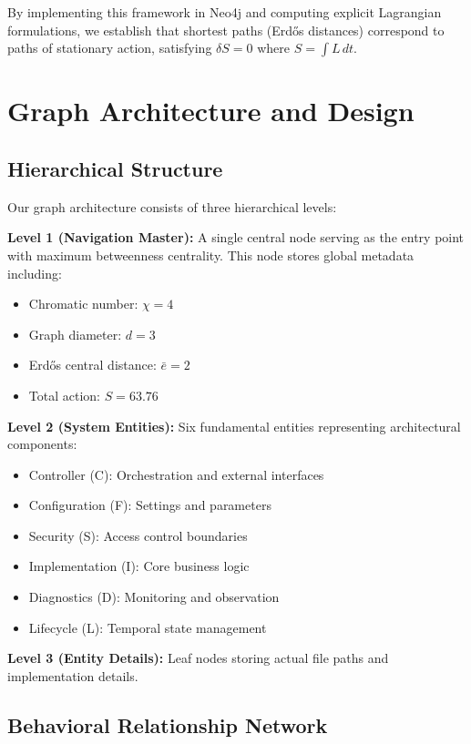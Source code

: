 \documentclass[12pt,a4paper]{article}
\begin{document}
By implementing this framework in Neo4j and computing explicit Lagrangian formulations, we establish that shortest paths (Erdős distances) correspond to paths of stationary action, satisfying $\delta S = 0$ where $S = \int L \, dt$.

\section{Graph Architecture and Design}

\subsection{Hierarchical Structure}

Our graph architecture consists of three hierarchical levels:

\textbf{Level 1 (Navigation Master):} A single central node serving as the entry point with maximum betweenness centrality. This node stores global metadata including:
\begin{itemize}
    \item Chromatic number: $\chi = 4$
    \item Graph diameter: $d = 3$
    \item Erdős central distance: $\bar{e} = 2$
    \item Total action: $S = 63.76$
\end{itemize}

\textbf{Level 2 (System Entities):} Six fundamental entities representing architectural components:
\begin{itemize}
    \item Controller (C): Orchestration and external interfaces
    \item Configuration (F): Settings and parameters
    \item Security (S): Access control boundaries
    \item Implementation (I): Core business logic
    \item Diagnostics (D): Monitoring and observation
    \item Lifecycle (L): Temporal state management
\end{itemize}

\textbf{Level 3 (Entity Details):} Leaf nodes storing actual file paths and implementation details.

\subsection{Behavioral Relationship Network}
\end{document}
